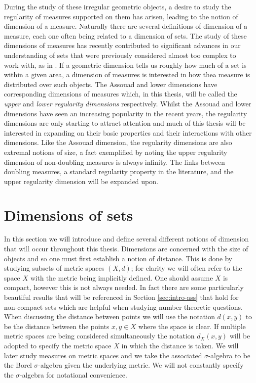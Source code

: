 During the study of these irregular geometric objects, a desire to study the regularity of measures supported on them has arisen, leading to the notion of dimension of a measure. Naturally there are several definitions of dimension of a measure, each one often being related to a dimension of sets. The study of these dimensions of measures has recently contributed to significant advances in our understanding of sets that were previously considered almost too complex to work with, as in \cite{hochman}. If a geometric dimension tells us roughly how much of a set is within a given area, a dimension of measures is interested in how thea measure is distributed over such objects. The Assouad and lower dimensions have corresponding dimensions of measures which, in this thesis, will be called the \textit{upper} and \textit{lower regularity dimensions} respectively. Whilst the Assouad and lower dimensions have seen an increasing popularity in the recent years, the regularity dimensions are only starting to attract attention and much of this thesis will be interested in expanding on their basic properties and their interactions with other dimensions. Like the Assouad dimension, the regularity dimensions are also extremal notions of size, a fact exemplified by noting the upper regularity dimension of non-doubling measures is always infinity. The links between doubling measures, a standard regularity property in the literature, and the upper regularity dimension will be expanded upon. 





\section{Dimensions of sets}
\label{sec:intro-sets}

In this section we will introduce and define several different notions of dimension that will occur throughout this thesis. Dimensions are concerned with the size of objects and so one must first establish a notion of distance. This is done by studying subsets of metric spaces $(X,d)$; for clarity we will often refer to the space $X$ with the metric being implicitly defined. One should assume $X$ is compact, however this is not always needed. In fact there are some particularly beautiful results that will be referenced in Section \ref{sec:intro-ass} that hold for non-compact sets which are helpful when studying number theoretic questions. When discussing the distance between points we will use the notation $d(x,y)$ to be the distance between the points $x,y \in X$ where the space is clear. If multiple metric spaces are being considered simultaneously the notation $d_X(x,y)$ will be adopted to specify the metric space $X$ in which the distance is taken. We will later study measures on metric spaces and we take the associated $\sigma$-algebra to be the Borel $\sigma$-algebra given the underlying metric. We will not constantly specify the $\sigma$-algebra for notational convenience.

